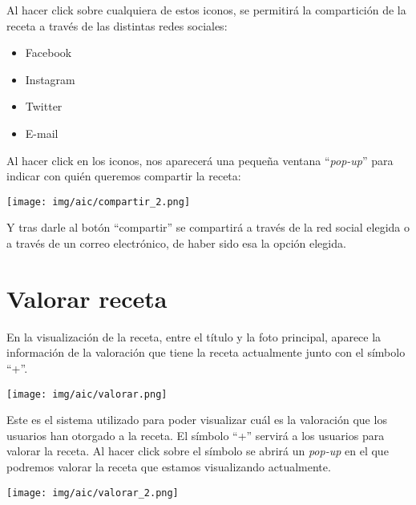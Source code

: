 \documentclass{\ClassPath/viu-tfm-template}
\begin{document}
Al hacer click sobre cualquiera de estos iconos, se permitirá la compartición de la receta a través de las distintas redes sociales:

\begin{itemize}
    \item Facebook
    \item Instagram
    \item Twitter
    \item E-mail
\end{itemize}

Al hacer click en los iconos, nos aparecerá una pequeña ventana “\textit{pop-up}” para indicar con quién queremos compartir la receta:

\begin{center}
    \vspace{-10pt}
    \texttt{[image: img/aic/compartir\_2.png]}
    \vspace{-20pt}
\end{center}

Y tras darle al botón “compartir” se compartirá a través de la red social elegida o a través de un correo electrónico, de haber sido esa la opción elegida.


\section{Valorar receta}
En la visualización de la receta, entre el título y la foto principal, aparece la información de la valoración que tiene la receta actualmente junto con el símbolo “+”.

\begin{center}
    \vspace{-10pt}
    \texttt{[image: img/aic/valorar.png]}
    \vspace{-20pt}
\end{center}

Este es el sistema utilizado para poder visualizar cuál es la valoración que los usuarios han otorgado a la receta. El símbolo “+” servirá a los usuarios para valorar la receta. Al hacer click sobre el símbolo se abrirá un \textit{pop-up} en el que podremos valorar la receta que estamos visualizando actualmente.

\begin{center}
    \vspace{-10pt}
    \texttt{[image: img/aic/valorar\_2.png]}
    \vspace{-10pt}
\end{center}
\end{document}
